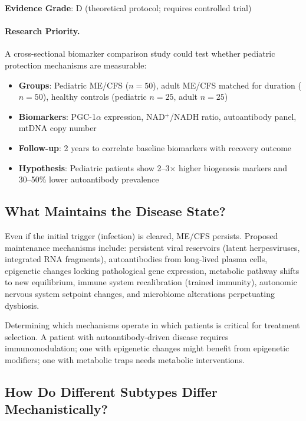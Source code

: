 \textbf{Evidence Grade}: D (theoretical protocol; requires controlled trial)

\paragraph{Research Priority.}

A cross-sectional biomarker comparison study could test whether pediatric protection mechanisms are measurable:

\begin{itemize}
    \item \textbf{Groups}: Pediatric ME/CFS ($n = 50$), adult ME/CFS matched for duration ($n = 50$), healthy controls (pediatric $n = 25$, adult $n = 25$)
    \item \textbf{Biomarkers}: PGC-1$\alpha$ expression, NAD$^+$/NADH ratio, autoantibody panel, mtDNA copy number
    \item \textbf{Follow-up}: 2 years to correlate baseline biomarkers with recovery outcome
    \item \textbf{Hypothesis}: Pediatric patients show 2--3$\times$ higher biogenesis markers and 30--50\% lower autoantibody prevalence
\end{itemize}

\subsection{What Maintains the Disease State?}

Even if the initial trigger (infection) is cleared, ME/CFS persists. Proposed maintenance mechanisms include: persistent viral reservoirs (latent herpesviruses, integrated RNA fragments), autoantibodies from long-lived plasma cells, epigenetic changes locking pathological gene expression, metabolic pathway shifts to new equilibrium, immune system recalibration (trained immunity), autonomic nervous system setpoint changes, and microbiome alterations perpetuating dysbiosis.

Determining which mechanisms operate in which patients is critical for treatment selection. A patient with autoantibody-driven disease requires immunomodulation; one with epigenetic changes might benefit from epigenetic modifiers; one with metabolic traps needs metabolic interventions.

\subsection{How Do Different Subtypes Differ Mechanistically?}

